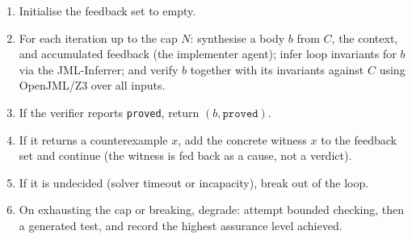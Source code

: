 \begin{enumerate}
\item Initialise the feedback set to empty.
\item For each iteration up to the cap $N$: synthesise a body $b$ from $C$, the context, and accumulated feedback (the implementer agent); infer loop invariants for $b$ via the JML-Inferrer; and verify $b$ together with its invariants against $C$ using OpenJML/Z3 over all inputs.
\item If the verifier reports \texttt{proved}, return $(b, \texttt{proved})$.
\item If it returns a counterexample $x$, add the concrete witness $x$ to the feedback set and continue (the witness is fed back as a cause, not a verdict).
\item If it is undecided (solver timeout or incapacity), break out of the loop.
\item On exhausting the cap or breaking, degrade: attempt bounded checking, then a generated test, and record the highest assurance level achieved.
\end{enumerate}

